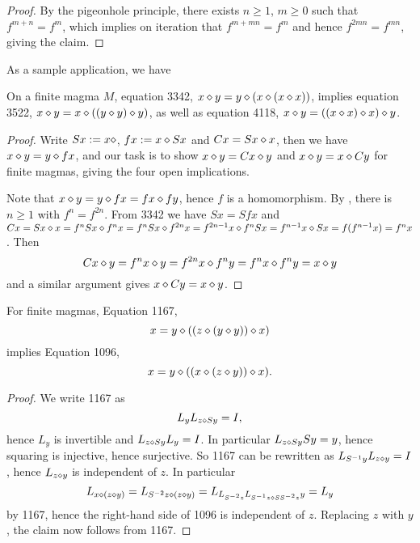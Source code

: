 \begin{proof} \leanok By the pigeonhole principle, there exists $n \geq 1$, $m \geq 0$ such that $f^{m+n} = f^m$, which implies on iteration that $f^{m+mn} = f^m$ and hence $f^{2mn} = f^{mn}$, giving the claim.
\end{proof}

As a sample application, we have

\begin{corollary}[3342]\label{3342}  \leanok  On a finite magma $M$, equation 3342, $x \diamond y= y \diamond (x \diamond (x \diamond x))$, implies
  equation 3522, $x \diamond y = x \diamond ((y \diamond y) \diamond y)$, as well as equation 4118, $x \diamond y = ((x \diamond x) \diamond x) \diamond y$.
\end{corollary}

\begin{proof} \leanok Write $Sx := x \diamond$, $fx := x \diamond Sx$ and $Cx = Sx \diamond x$, then we have $x \diamond y= y \diamond fx$, and our task is to show $x \diamond y = Cx \diamond y$ and $x \diamond y = x \diamond Cy$ for finite magmas, giving the four open implications.

Note that $x \diamond y= y \diamond fx = fx \diamond fy$, hence $f$ is a homomorphism.  By , there is $n \geq 1$ with $f^n = f^{2n}$.  From 3342 we have $Sx = S fx$ and $Cx = Sx \diamond x = f^n Sx \diamond f^n x = f^n Sx \diamond f^{2n} x = f^{2n-1} x \diamond f^n Sx = f^{n-1} x \diamond S x = f(f^{n-1} x) = f^n x$.  Then
$$ Cx \diamond y = f^n x \diamond y = f^{2n} x \diamond f^n y = f^n x \diamond f^n y = x \diamond y$$
and a similar argument gives $x \diamond Cy = x \diamond y$.
\end{proof}

\begin{proposition}[1167 implies 1096]\label{1167-1096}
  For finite magmas, Equation 1167,
  $$ x = y \diamond ((z \diamond (y \diamond y)) \diamond x)$$
implies Equation 1096,
$$ x = y \diamond ((x \diamond (z \diamond y)) \diamond x).$$
\end{proposition}

\begin{proof} We write 1167 as
  $$ L_y L_{z \diamond Sy} = I,$$
hence $L_y$ is invertible and $L_{z \diamond Sy} L_y = I$.  In particular $L_{z \diamond Sy} Sy = y$, hence squaring is injective, hence surjective.  So 1167 can be rewritten as $L_{S^{-1} y} L_{z \diamond y} = I$, hence $L_{z \diamond y}$ is independent of $z$.  In particular
$$ L_{x \diamond (z \diamond y)} = L_{S^{-2} z \diamond (z \diamond y)} = L_{L_{S^{-2} z} L_{S^{-1} z \diamond S S^{-2} z} y} = L_y$$
by 1167, hence the right-hand side of 1096 is independent of $z$.  Replacing $z$ with $y$, the claim now follows from 1167.
\end{proof}

